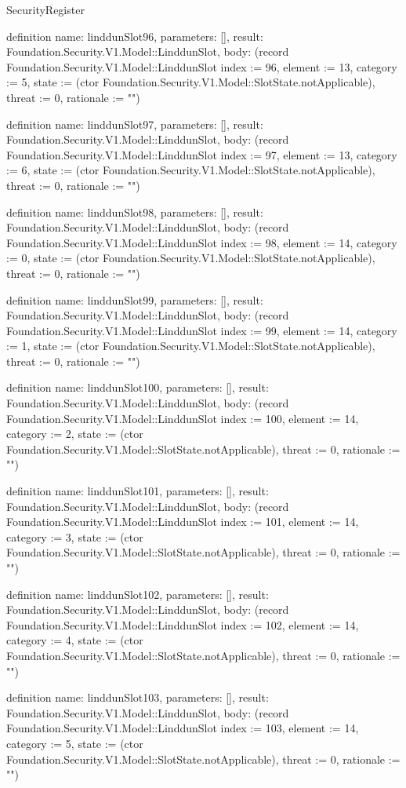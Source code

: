 \begin{lexlean}{SecurityRegister}
\begin{semanticmodule}
definition{
  name: linddunSlot96,
  parameters: [],
  result: Foundation.Security.V1.Model::LinddunSlot,
  body: (record Foundation.Security.V1.Model::LinddunSlot {index := 96, element := 13, category := 5, state := (ctor Foundation.Security.V1.Model::SlotState.notApplicable), threat := 0, rationale := ""})
}

definition{
  name: linddunSlot97,
  parameters: [],
  result: Foundation.Security.V1.Model::LinddunSlot,
  body: (record Foundation.Security.V1.Model::LinddunSlot {index := 97, element := 13, category := 6, state := (ctor Foundation.Security.V1.Model::SlotState.notApplicable), threat := 0, rationale := ""})
}

definition{
  name: linddunSlot98,
  parameters: [],
  result: Foundation.Security.V1.Model::LinddunSlot,
  body: (record Foundation.Security.V1.Model::LinddunSlot {index := 98, element := 14, category := 0, state := (ctor Foundation.Security.V1.Model::SlotState.notApplicable), threat := 0, rationale := ""})
}

definition{
  name: linddunSlot99,
  parameters: [],
  result: Foundation.Security.V1.Model::LinddunSlot,
  body: (record Foundation.Security.V1.Model::LinddunSlot {index := 99, element := 14, category := 1, state := (ctor Foundation.Security.V1.Model::SlotState.notApplicable), threat := 0, rationale := ""})
}

definition{
  name: linddunSlot100,
  parameters: [],
  result: Foundation.Security.V1.Model::LinddunSlot,
  body: (record Foundation.Security.V1.Model::LinddunSlot {index := 100, element := 14, category := 2, state := (ctor Foundation.Security.V1.Model::SlotState.notApplicable), threat := 0, rationale := ""})
}

definition{
  name: linddunSlot101,
  parameters: [],
  result: Foundation.Security.V1.Model::LinddunSlot,
  body: (record Foundation.Security.V1.Model::LinddunSlot {index := 101, element := 14, category := 3, state := (ctor Foundation.Security.V1.Model::SlotState.notApplicable), threat := 0, rationale := ""})
}

definition{
  name: linddunSlot102,
  parameters: [],
  result: Foundation.Security.V1.Model::LinddunSlot,
  body: (record Foundation.Security.V1.Model::LinddunSlot {index := 102, element := 14, category := 4, state := (ctor Foundation.Security.V1.Model::SlotState.notApplicable), threat := 0, rationale := ""})
}

definition{
  name: linddunSlot103,
  parameters: [],
  result: Foundation.Security.V1.Model::LinddunSlot,
  body: (record Foundation.Security.V1.Model::LinddunSlot {index := 103, element := 14, category := 5, state := (ctor Foundation.Security.V1.Model::SlotState.notApplicable), threat := 0, rationale := ""})
}


\end{semanticmodule}
\end{lexlean}
